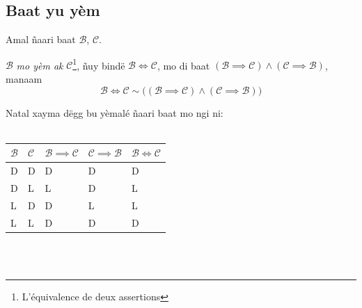\documentclass[twoside, a4paper]{article}
\begin{document}
\subsection{Baat yu yèm}
\begin{tcolorbox}[enhanced jigsaw,breakable,pad at break*=1mm, colback=red!5!white,colframe=white!75!black,title= Téeki,
  watermark color=white]
 Amal ñaari baat $\mathcal{B}$, $\mathcal{C}$.
 
 $\mathcal{B}$ \textit{mo yèm ak} $\mathcal{C}$\footnote{L'équivalence de deux assertions}, ñuy bindë $\mathcal{B}\iff \mathcal{C} $, mo di baat $(\mathcal{B}\implies \mathcal{C}) \land (\mathcal{C}\implies \mathcal{B})$, manaam $$\mathcal{B}\iff \mathcal{C} \sim \big( (\mathcal{B}\implies \mathcal{C}) \land (\mathcal{C}\implies \mathcal{B})\big) $$

Natal xayma dëgg bu yèmalé ñaari baat mo ngi ni:\\\\

 \begin{tabularx}{0.8\textwidth} { 
  | >{\centering\arraybackslash}X 
  | >{\centering\arraybackslash}X 
  | >{\centering\arraybackslash}X 
  | >{\centering\arraybackslash}X 
  | >{\centering\arraybackslash}X |}
 \hline
$\mathcal{B}$& $\mathcal{C}$ & $\mathcal{B}\implies\mathcal{C}$ & $\mathcal{C}\implies\mathcal{B}$&$\mathcal{B}\iff\mathcal{C}$ \\
 \hline
 D  & D & D & D & D\\
 D  & L & L & D & L\\
 L  & D & D & L & L\\
 L  & L & D & D & D\\
\hline
\end{tabularx}\\\\
\end{tcolorbox}
\end{document}
